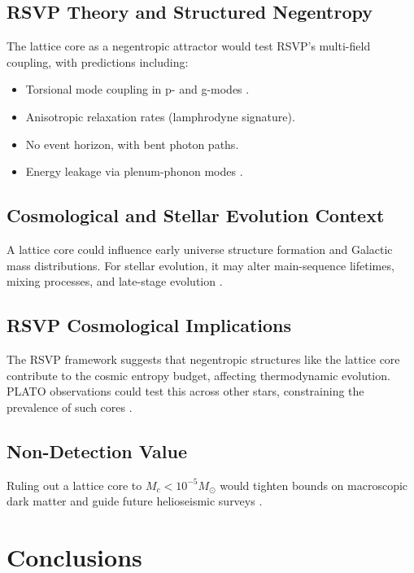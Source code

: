 \documentclass{article}
\begin{document}
\subsection{RSVP Theory and Structured Negentropy}

The lattice core as a negentropic attractor would test RSVP’s multi-field coupling, with predictions including:
\begin{itemize}
\item Torsional mode coupling in p- and g-modes \citep{kunitomo2022}.
\item Anisotropic relaxation rates (lamphrodyne signature).
\item No event horizon, with bent photon paths.
\item Energy leakage via plenum-phonon modes \citep{markovic1995}.
\end{itemize}

\subsection{Cosmological and Stellar Evolution Context}

A lattice core could influence early universe structure formation and Galactic mass distributions. For stellar evolution, it may alter main-sequence lifetimes, mixing processes, and late-stage evolution \citep{kunitomo2021, farag2024}.

\subsection{RSVP Cosmological Implications}

The RSVP framework suggests that negentropic structures like the lattice core contribute to the cosmic entropy budget, affecting thermodynamic evolution. PLATO observations could test this across other stars, constraining the prevalence of such cores \citep{lund2017}.

\subsection{Non-Detection Value}

Ruling out a lattice core to $M_c < 10^{-5} M_\odot$ would tighten bounds on macroscopic dark matter and guide future helioseismic surveys \citep{bellinger2025, clemente2025}.

\section{Conclusions}
\end{document}

